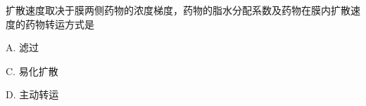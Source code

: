 \begin{frame}[t]
    \frametitle{}
    \begin{question}
        扩散速度取决于膜两侧药物的浓度梯度，药物的脂水分配系数及药物在膜内扩散速度的药物转运方式是
        \tcblower

        A. 滤过


        C. 易化扩散
        
        D. 主动转运

        
    \end{question}
\end{frame}